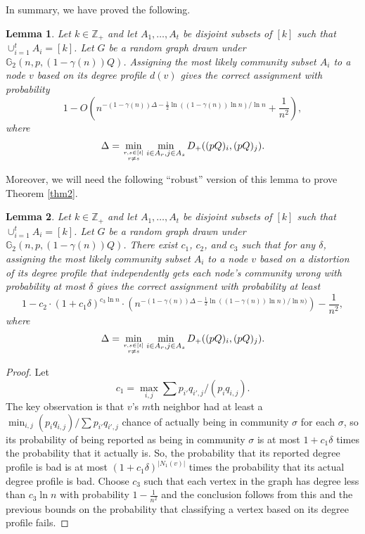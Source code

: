 \documentclass[11pt]{article}
\newcommand{\gs}{\mathbb{G}_2}
\newcommand{\dd}{D_+}
\newcommand{\mZ}{\mathbb{Z}}
\newcommand{\1}{\mathbb{1}}
\newtheorem{lemma}{Lemma}
\begin{document}
In summary, we have proved the following. 
\begin{lemma}\label{testing-lemma}
Let $k \in \mZ_+$ and let $A_1,\dots,A_t$ be disjoint subsets of $[k]$ such that $\cup_{i=1}^t A_i = [k]$. Let $G$ be a random graph drawn under $\gs(n,p,(1-\gamma(n))Q)$. Assigning the most likely community subset $A_i$ to a node $v$ based on its degree profile $d(v)$ gives the correct assignment with probability $$1-O \left(n^{-(1-\gamma(n))\Delta -\frac{1}{2}\ln((1-\gamma(n))\ln n)/\ln n } +\frac{1}{n^2}\right),$$ 
where
\begin{align}
\Delta = \min_{r,s \in [t] \atop{r \neq s}} \min_{ i \in A_r, j \in A_s}  \dd((pQ)_i, (pQ)_j).
\end{align}
\end{lemma}
Moreover, we will need the following ``robust'' version of this lemma to prove Theorem \ref{thm2}. 
\begin{lemma}\label{testing-lemma2}
Let $k \in \mZ_+$ and let $A_1,\dots,A_t$ be disjoint subsets of $[k]$ such that $\cup_{i=1}^t A_i = [k]$. Let $G$ be a random graph drawn under $\gs(n,p,(1-\gamma(n))Q)$. There exist $c_1$, $c_2$, and $c_3$ such that for any $\delta$, assigning the most likely community subset $A_i$ to a node $v$ based on a distortion of its degree profile that independently gets each node's community wrong with probability at most $\delta$ gives the correct assignment with probability at least $$1- c_2\cdot (1+c_1\delta)^{c_3\ln n} \cdot \left(n^{-(1-\gamma(n))\Delta -\frac{1}{2}\ln((1-\gamma(n))\ln n)/\ln n) } \right)-\frac{1}{n^2},$$ 
where
\begin{align}
\Delta = \min_{r,s \in [t] \atop{r \neq s}} \min_{ i \in A_r, j \in A_s}  \dd((pQ)_i, (pQ)_j).
\end{align}
\end{lemma}

\begin{proof}
Let $$c_1=\max_{i,j} \sum p_{i'}q_{i',j}/(p_i q_{i,j}).$$ The key observation is that $v$'s $m$th neighbor had at least a $\min_{i,j} (p_i q_{i,j})/\sum p_{i'}q_{i',j}$ chance of actually being in community $\sigma$ for each $\sigma$, so its probability of being reported as being in community $\sigma$ is at most $1+c_1\delta$ times the probability that it actually is. So, the probability that its reported degree profile is bad is at most $(1+c_1\delta)^{|N_1(v)|}$ times the probability that its actual degree profile is bad. Choose $c_3$ such that each vertex in the graph has degree less than $c_3\ln n$ with probability $1-\frac{1}{n^2}$ and the conclusion follows from this and the previous bounds on the probability that classifying a vertex based on its degree profile fails.
\end{proof}
\end{document}
